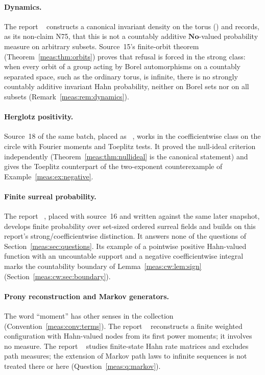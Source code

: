 \documentclass[11pt]{article}
\numberwithin{equation}{section}
\theoremstyle{definition}
\theoremstyle{remark}
\newcommand{\No}{\mathbf{No}}
\begin{document}
\paragraph{Dynamics.} The report
~\cite{repodyn} constructs a
canonical invariant density on the torus () and
records, as its non-claim N75, that this is not a countably additive
$\No$-valued probability measure on arbitrary subsets. Source~15's finite-orbit
theorem (Theorem~\ref{meas:thm:orbits}) proves that refusal is forced in the
strong class: when every orbit of a group acting by Borel automorphisms on a
countably separated space, such as the ordinary torus, is infinite, there is no
strongly countably additive invariant Hahn probability, neither on Borel sets
nor on all subsets (Remark~\ref{meas:rem:dynamics}).

\paragraph{Herglotz positivity.} Source~18 of the same batch, placed as
~\cite{repoherg}, works in the
coefficientwise class on the circle with Fourier moments and Toeplitz tests.
It proved the null-ideal criterion independently
(Theorem~\ref{meas:thm:nullideal} is the canonical statement) and gives the
Toeplitz counterpart of the two-exponent counterexample of
Example~\ref{meas:ex:negative}.

\paragraph{Finite surreal probability.} The report
~\cite{repofsp}, placed with source~16
and written against the same later snapshot, develops finite probability over
set-sized ordered surreal fields and builds on this report's
strong/coefficientwise distinction. It answers none of the questions of
Section~\ref{meas:sec:questions}. Its example of a pointwise positive Hahn-valued
function with an uncountable support and a negative coefficientwise integral
marks the countability boundary of Lemma~\ref{meas:cw:lem:sign}
(Section~\ref{meas:cw:sec:boundary}).

\paragraph{Prony reconstruction and Markov generators.} The word ``moment''
has other senses in the collection (Convention~\ref{meas:conv:terms}). The
report ~\cite{repoprony}
reconstructs a finite weighted configuration with Hahn-valued nodes from its
first power moments; it involves no measure. The report
~\cite{repomarkov} studies
finite-state Hahn rate matrices and excludes path measures; the extension of
Markov path laws to infinite sequences is not treated there or here
(Question~\ref{meas:q:markov}).
\end{document}
